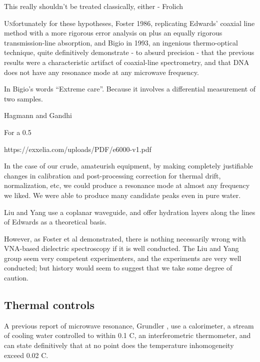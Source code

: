 \documentclass[paper.tex]{subfiles}
\begin{document}
This really shouldn’t be treated classically, either - Frolich 

\lettrine{U}nfortunately for these hypotheses, Foster 1986, replicating Edwards’ coaxial line method with a more rigorous error analysis on plus an equally rigorous transmission-line absorption, and Bigio in 1993, an ingenious thermo-optical technique, quite definitively demonstrate - to absurd precision -  that the previous results were a characteristic artifact of coaxial-line spectrometry, and that DNA does not have any resonance mode at any microwave frequency.

In Bigio’s words “Extreme care”. Because it involves a differential measurement of two samples.

Hagmann and Gandhi \cite{Substitution1982}



For a 0.5%

https://exxelia.com/uploads/PDF/e6000-v1.pdf


In the case of our crude, amateurish equipment, by making completely justifiable changes in calibration and post-processing correction for thermal drift, normalization, etc, we could produce a resonance mode at almost any frequency we liked. We were able to produce many candidate peaks even in pure water.


Liu and Yang use a coplanar waveguide, and offer hydration layers along the lines of Edwards as a theoretical basis.




However, as Foster et al demonstrated, there is nothing necessarily wrong with VNA-based dielectric spectroscopy if it is well conducted. The Liu and Yang group seem very competent experimenters, and the experiments are very well conducted; but history would seem to suggest that we take some degree of caution.




\subsection{Thermal controls}

A previous report of microwave resonance, Grundler \cite{Sharp1983}, use a calorimeter, a stream of cooling water controlled to within 0.1 C, an interferometric thermometer, and can state definitively that at no point does the temperature inhomogeneity exceed 0.02 C.
\end{document}
